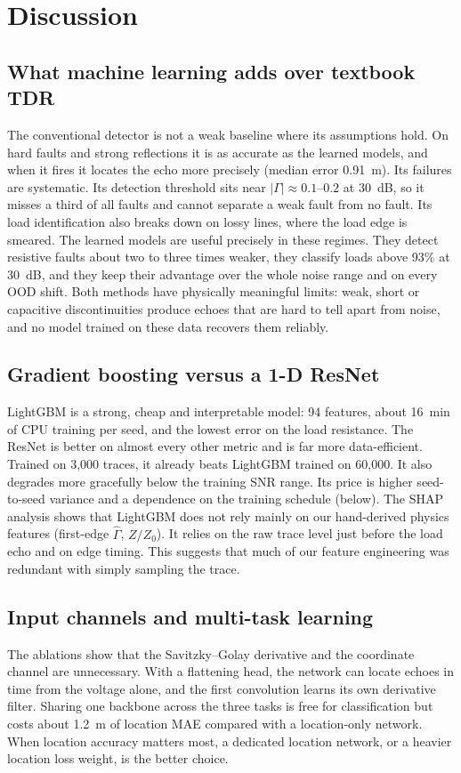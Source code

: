 \section{Discussion}
\label{sec:discussion}

\subsection{What machine learning adds over textbook TDR}
The conventional detector is not a weak baseline where its assumptions hold. On hard faults and strong reflections it is as accurate as the learned models, and when it fires it locates the echo more precisely (median error 0.91~m). Its failures are systematic. Its detection threshold sits near $|\Gamma| \approx 0.1$--$0.2$ at 30~dB, so it misses a third of all faults and cannot separate a weak fault from no fault. Its load identification also breaks down on lossy lines, where the load edge is smeared.
The learned models are useful precisely in these regimes. They detect resistive faults about two to three times weaker, they classify loads above 93\% at 30~dB, and they keep their advantage over the whole noise range and on every OOD shift. Both methods have physically meaningful limits: weak, short or capacitive discontinuities produce echoes that are hard to tell apart from noise, and no model trained on these data recovers them reliably.

\subsection{Gradient boosting versus a 1-D ResNet}
LightGBM is a strong, cheap and interpretable model: 94 features, about 16~min of CPU training per seed, and the lowest error on the load resistance. The ResNet is better on almost every other metric and is far more data-efficient. Trained on 3,000 traces, it already beats LightGBM trained on 60,000. It also degrades more gracefully below the training SNR range. Its price is higher seed-to-seed variance and a dependence on the training schedule (below). The SHAP analysis shows that LightGBM does not rely mainly on our hand-derived physics features (first-edge $\hat\Gamma$, $Z/Z_0$). It relies on the raw trace level just before the load echo and on edge timing. This suggests that much of our feature engineering was redundant with simply sampling the trace.

\subsection{Input channels and multi-task learning}
The ablations show that the Savitzky--Golay derivative and the coordinate channel are unnecessary. With a flattening head, the network can locate echoes in time from the voltage alone, and the first convolution learns its own derivative filter. Sharing one backbone across the three tasks is free for classification but costs about 1.2~m of location MAE compared with a location-only network. When location accuracy matters most, a dedicated location network, or a heavier location loss weight, is the better choice.

